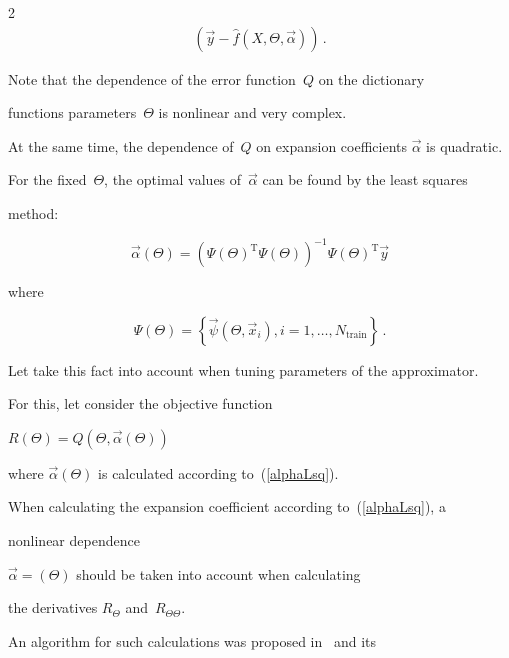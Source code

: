 \begin{multicols}{2}
\begin{multline*}
  \left( \vec y - \hat f \left( X, \Theta, \vec\alpha \right) \right)\,.

\end{multline*}



Note that the dependence of the error function~$Q$ on the dictionary 

functions parameters~$\Theta$ is nonlinear and very complex.

At the same time, the dependence of~$Q$ on expansion coefficients $\vec \alpha$ is quadratic.

For the fixed~$\Theta$, the optimal values of~$\vec\alpha$ can be found by the least squares 

method:

\begin{equation}

\label{alphaLsq}

\vec\alpha \left( \Theta \right) =

 \left( \Psi\left( \Theta \right)^{\mathrm{T}} \Psi\left( \Theta \right) \right)^{-1}

 \Psi\left( \Theta \right)^{\mathrm{T}} \vec y

 \end{equation}

  where  

  $$

  \Psi\left( \Theta \right) = \left\{{\vec \psi} \left( {\Theta}, {\vec x}_i \right),

  i = 1,\ldots,N_{\mathrm{train}}\right\}\,.

$$



Let take this fact into account when tuning parameters of the approximator. 

For this, let consider the objective function

  $R\left( \Theta \right) = Q\left( \Theta, \vec\alpha\left(\Theta\right) \right)$

  where $\vec\alpha\left(\Theta\right)$ is calculated according to~(\ref{alphaLsq}).

When calculating the expansion coefficient according to~(\ref{alphaLsq}), a 

nonlinear dependence 

$\vec\alpha =  \left( \Theta \right)$ should be taken into account when calculating 

the derivatives $R_\Theta$ and~$R_{\Theta\Theta}$.

An algorithm for such calculations was proposed in~\cite{golub} and its 


\end{multicols}
